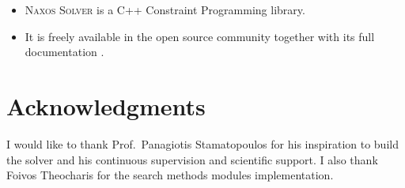 \documentclass[a4paper]{article}
\begin{document}
\title{}

\author{Nikolaos Pothitos}


\date{}

\maketitle

\begin{itemize}
  \item \textsc{Naxos Solver} is a C++ Constraint
        Programming library.
  \item It is freely available in the open source community
        together with its full documentation \cite{Naxos}.
\end{itemize}

\section*{Acknowledgments}

I would like to thank Prof.\ Panagiotis Stamatopoulos for
his inspiration to build the solver and his continuous
supervision and scientific support. I also thank Foivos
Theocharis for the search methods modules implementation.

\nocite{*}


\end{document}
